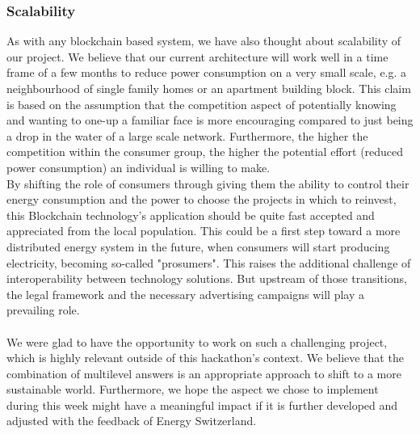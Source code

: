 \documentclass[11pt]{article}
\begin{document}
\subsubsection{Scalability}
As with any blockchain based system, we have also thought about scalability of our project. We believe that our current architecture will work well in a time frame of a few months to reduce power consumption on a very small scale, e.g. a neighbourhood of single family homes or an apartment building block. This claim is based on the assumption that the competition aspect of potentially knowing and wanting to one-up a familiar face is more encouraging compared to just being a drop in the water of a large scale network. Furthermore, the higher the competition within the consumer group, the higher the potential effort (reduced power consumption) an individual is willing to make.\\
By shifting the role of consumers through giving them the ability to control their energy consumption and the power to choose the projects in which to reinvest, this Blockchain technology's application should be quite fast accepted and appreciated from the local population. This could be a first step toward a more distributed energy system in the future, when consumers will start producing electricity, becoming so-called "prosumers". This raises the additional challenge of interoperability between technology solutions. But upstream of those transitions, the legal framework and the necessary advertising campaigns will play a prevailing role.\cite{25}\\\\
We were glad to have the opportunity to work on such a challenging project, which is highly relevant outside of this hackathon's context. We believe that the combination of multilevel answers is an appropriate approach to shift to a more sustainable world. Furthermore, we hope the aspect we chose to implement during this week might have a meaningful impact if it is further developed and adjusted with the feedback of Energy Switzerland.
\end{document}
